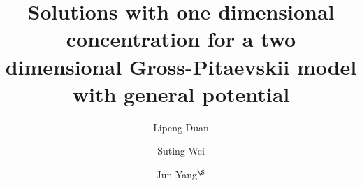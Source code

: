 \documentclass[10pt, reqno]{amsart}
\numberwithin{equation}{section}
\theoremstyle{definition}
\begin{document}
\title
[Gross-Pitaevskii equation with non-symmetric potential]
{Solutions with one dimensional concentration for a two dimensional Gross-Pitaevskii model with general potential}

\author{Lipeng Duan}
\address{Lipeng Duan,
\newline\indent School of Mathematics and Information Science, Guangzhou University,
\newline\indent Guangzhou 510006, P. R. China.
}

\author{Suting Wei}
\address{Suting Wei,
\newline\indent Department of Mathematics, South China
Agricultural University,
\newline\indent Guangzhou, 510642, P. R. China.
}


\author{Jun Yang$^\S$}
\address{School of Mathematics and Information Science,
Guangzhou University,
\newline\indent Guangzhou 510006, P. R. China.
}
\end{document}

